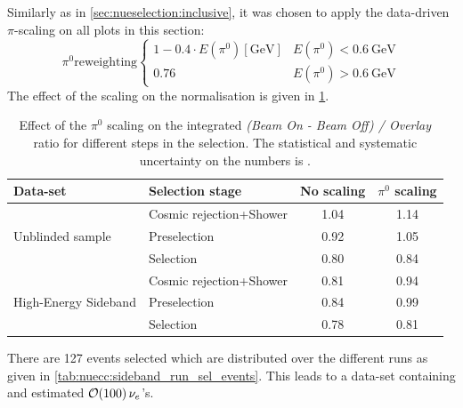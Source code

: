 Similarly as in \cref{sec:nueselection:inclusive}, it was chosen to apply the data-driven $\pi$-scaling on all plots in this section:
\begin{equation*}
\pi^0 \text{reweighting} \left\{
    \begin{array}{ll}
        1 - 0.4 \cdot E(\pi^0)[\si{\GeV}] & E(\pi^0) < \SI{0.6}{\GeV} \\
        0.76 & E(\pi^0) > \SI{0.6}{\GeV}
    \end{array}
\right.
\end{equation*}
The effect of the scaling on the normalisation is given in \cref{tab:nuecc:pi0scaling}.

\begin{table}[htb]
    \centering
    \begin{tabular}{@{}llcc@{}}
\toprule
    Data-set                                  & Selection stage   & No scaling & $\pi^0$ scaling \\ \midrule
\multirow{3}{*}{Unblinded sample}     & Cosmic rejection+Shower & 1.04       & 1.14         \\
                                      & Preselection            & 0.92       & 1.05        \\
                                      & Selection               & 0.80       & 0.84         \\
\multirow{3}{*}{High-Energy Sideband} & Cosmic rejection+Shower & 0.81       & 0.94         \\
                                      & Preselection            & 0.84       & 0.99        \\
                                      & Selection               & 0.78       & 0.81         \\ \bottomrule
\end{tabular} 
    \caption{Effect of the $\pi^0$ scaling on the integrated \textit{(Beam On - Beam Off) / Overlay} ratio for different steps in the selection. The statistical and systematic uncertainty on the numbers is .}
    \label{tab:nuecc:pi0scaling}
\end{table}

There are 127 events selected which are distributed over the different runs as given in \cref{tab:nuecc:sideband_run_sel_events}. This leads to a data-set containing and estimated $\order{100} \, \nu_e$'s.

